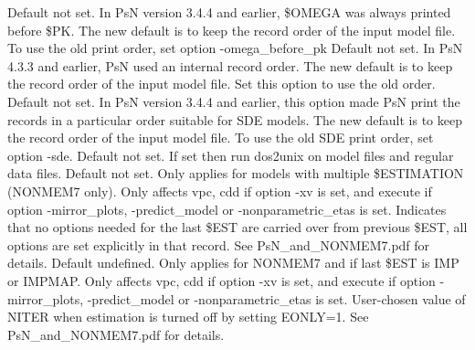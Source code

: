 \begin{optionlist}
Default not set. In PsN version 3.4.4 and earlier, \$OMEGA was always printed before \$PK. The new default is to keep the record order of the input model file. To use the old print order, set option -omega\_before\_pk
\nextopt
{}
Default not set. In PsN 4.3.3 and earlier, PsN used an internal record order. The new default is to keep the record order of the input model file. Set this option to use the old order.
\nextopt
{}
Default not set. In PsN version 3.4.4 and earlier, this option made PsN print the records
in a particular order suitable for SDE models.
The new default is to keep the record order of the input model file. To use the old SDE print order, 
set option -sde.
\nextopt
{}
Default not set. If set then run dos2unix on model files and regular data files.
\nextopt
{}
Default not set. Only applies for models with multiple \$ESTIMATION (NONMEM7 only). 
Only affects vpc,  cdd if option -xv is set, and execute if option -mirror\_plots,
-predict\_model or -nonparametric\_etas is set. Indicates that no options needed for the last \$EST 
are carried over from previous \$EST, all options are set explicitly in that record. See PsN\_and\_NONMEM7.pdf 
for details. 
\nextopt
{}
Default undefined. Only applies for NONMEM7 and if last \$EST is IMP or IMPMAP. 
Only affects vpc,  cdd if option -xv is set, and execute if option -mirror\_plots, -predict\_model
 or -nonparametric\_etas is set. 
User-chosen value of NITER when estimation is turned off by setting EONLY=1. See PsN\_and\_NONMEM7.pdf for details. 
\nextopt
\end{optionlist}
